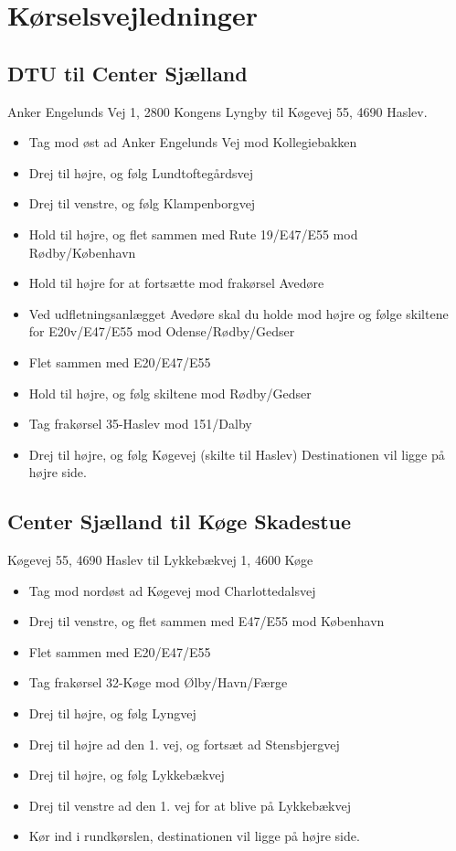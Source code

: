 \section{Kørselsvejledninger}
\subsection{DTU til Center Sjælland}
Anker Engelunds Vej 1, 2800 Kongens Lyngby til Køgevej 55, 4690 Haslev.
\begin{itemize}
\item Tag mod øst ad Anker Engelunds Vej mod Kollegiebakken
\item Drej til højre, og følg Lundtoftegårdsvej
\item Drej til venstre, og følg Klampenborgvej
\item Hold til højre, og flet sammen med Rute 19/E47/E55 mod Rødby/København
\item Hold til højre for at fortsætte mod frakørsel Avedøre
\item Ved udfletningsanlægget Avedøre skal du holde mod højre og følge skiltene for E20v/E47/E55 mod Odense/Rødby/Gedser
\item Flet sammen med E20/E47/E55
\item Hold til højre, og følg skiltene mod Rødby/Gedser
\item Tag frakørsel 35-Haslev mod 151/Dalby
\item Drej til højre, og følg Køgevej (skilte til Haslev) Destinationen vil ligge på højre side.
\end{itemize}

\subsection{Center Sjælland til Køge Skadestue}
Køgevej 55, 4690 Haslev til Lykkebækvej 1, 4600 Køge
\begin{itemize}
\item Tag mod nordøst ad Køgevej mod Charlottedalsvej
\item Drej til venstre, og flet sammen med E47/E55 mod København
\item Flet sammen med E20/E47/E55
\item Tag frakørsel 32-Køge mod Ølby/Havn/Færge
\item Drej til højre, og følg Lyngvej
\item Drej til højre ad den 1. vej, og fortsæt ad Stensbjergvej
\item Drej til højre, og følg Lykkebækvej
\item Drej til venstre ad den 1. vej for at blive på Lykkebækvej
\item Kør ind i rundkørslen, destinationen vil ligge på højre side.
\end{itemize}

